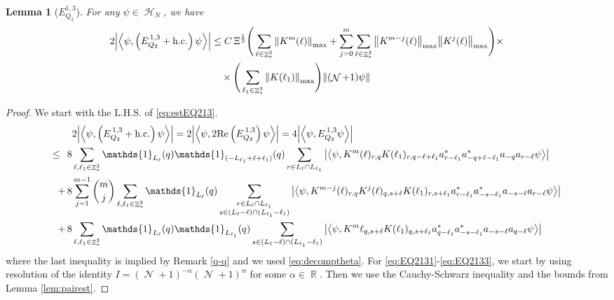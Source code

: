 \documentclass[sn-mathphys, Numbered ,a4paper]{sn-jnl}%
\DeclareMathOperator{\R}{\mathbb{R}}
\DeclareMathOperator{\Z}{\mathbb{Z}}
\DeclareMathOperator{\HH}{\mathcal{H}}
\DeclareMathOperator{\NN}{\mathcal{N}}
\newcommand{\half}{\frac{1}{2}}
\newcommand{\eva}[1]{\left\langle #1 \right\rangle}
\theoremstyle{plain}
\newtheorem{lemma}[theorem]{Lemma}
\theoremstyle{definition}
\theoremstyle{remark}
\theoremstyle{plain}
\theoremstyle{definition}
\theoremstyle{remark}
\begin{document}
\begin{lemma}[$E_{Q_2}^{1,3}$]
For any $\psi \in \HH_N$, we have
\begin{align}
	2\abs{\eva{\psi,\left(E^{\,1,3}_{Q_2}+\mathrm{h.c.}\right) \psi }}
  	&\leq  C\, \Xi^{\half} \Bigg(\sum\limits_{\ell \in \Z^3_*} \norm{K^m(\ell)}_{\mathrm{max}} + \sum\limits_{j=0}^m \sum\limits_{\ell \in \Z^3_*}\norm{K^{m-j}(\ell)}_{\mathrm{max}}\norm{K^{j}(\ell)}_{\mathrm{max}}\Bigg)\times\nonumber\\&\quad\times \Bigg( \sum\limits_{\ell_1 \in \Z^3_*}\norm{K(\ell_1)}_{\mathrm{max}} \Bigg)  \norm { (\NN+1) \psi }    \label{eq:estEQ213}
\end{align}
\end{lemma}
\begin{proof}
We start with the L.H.S. of \eqref{eq:estEQ213}.
\begin{align}
	&2\abs{\eva{\psi,\left(E^{\,1,3}_{Q_2}+\mathrm{h.c.}\right) \psi }} = 2\abs{\eva{\psi,2\mathrm{Re}\left(E^{\,1,3}_{Q_2}\right) \psi }} = 4\abs{\eva{\psi, E^{\,1,3}_{Q_2} \psi }}\nonumber\\
    \leq\,\;8& \sum\limits_{\ell, \ell_1\in \Z^3_*} \mathds{1}_{L_{\ell}}(q) \mathds{1}_{(-L_{\ell_1}+\ell+\ell_1)}(q) \sum\limits_{r\in L_{\ell} \cap L_{\ell_1}} \abs{\eva{\psi, K^m(\ell)_{r,q}K(\ell_1)_{r,q-\ell+\ell_1}a^*_{r-\ell_1}a^*_{-q+\ell-\ell_1} a_{-q}a_{r-\ell} \psi }}\label{eq:EQ2131}\\
    +\,8& \sum\limits_{j=1}^{m-1} {{m}\choose j} \sum\limits_{\ell, \ell_1\in \Z^3_*}\mathds{1}_{L_{\ell}}(q) \sum\limits_{\substack{r\in L_{\ell} \cap L_{\ell_1}\\ s \in (L_{\ell}-\ell) \cap (L_{\ell_1}-\ell_1)}}  \abs{\eva{\psi, K^{m-j}(\ell)_{r,q} K^{j}(\ell)_{q,s+\ell} K(\ell_1)_{r,s+\ell_1}a^*_{r-\ell_1}a^*_{-s-\ell_1} a_{-s-\ell}a_{r-\ell}  \psi }}\label{eq:EQ2132}\\
    +\,8&\sum\limits_{\ell, \ell_1\in \Z^3_*} \mathds{1}_{L_{\ell}}(q) \mathds{1}_{L_{\ell_1}}(q) \sum\limits_{ s \in (L_{\ell}-\ell) \cap (L_{\ell_1}-\ell_1)} \abs{\eva{\psi, K^m{\ell}_{q,s+\ell} K(\ell_1)_{q,s+\ell_1} a^*_{q-\ell_1} a^*_{-s-\ell_1} a_{-s-\ell} a_{q-\ell} \psi }}\label{eq:EQ2133}
\end{align}
where the last inequality is implied by Remark \ref{q-q} and we used \eqref{eq:decomptheta}.
For \eqref{eq:EQ2131}-\eqref{eq:EQ2133}, we start by using resolution of the identity $I = (\NN+1)^{-\alpha}(\NN+1)^{\alpha}$ for some $\alpha \in \R$. Then we use the Cauchy-Schwarz inequality and the bounds from Lemma \ref{lem:pairest}.

\end{proof}
\end{document}
